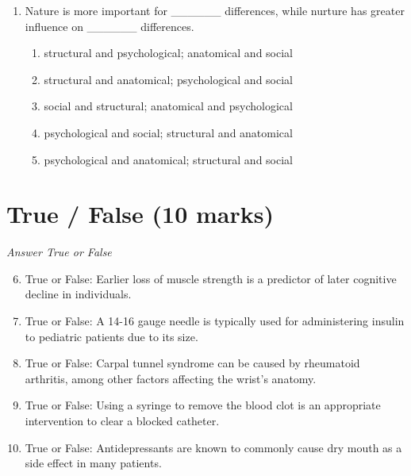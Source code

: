 \documentclass[12pt]{article}
\begin{document}
\begin{enumerate}[label=\arabic*.]
\begin{enumerate}[label=(\alph*)]
    \item If the incidence rate of the disease falls.
    \item If effective treatment for the disease becomes widely available.
    \item If vaccination against the disease becomes more common.
    \item If the disease mutates to a less harmful form.
    \item If the population's overall health improves.
\end{enumerate}
\item Nature is more important for \_\_\_\_\_\_ differences, while nurture has greater influence on \_\_\_\_\_\_ differences.
\begin{enumerate}[label=(\alph*)]
    \item structural and psychological; anatomical and social
    \item structural and anatomical; psychological and social
    \item social and structural; anatomical and psychological
    \item psychological and social; structural and anatomical
    \item psychological and anatomical; structural and social
\end{enumerate}
\end{enumerate}

\section*{True / False (10 marks)}
\textit{Answer True or False}
\begin{enumerate}[label=\arabic*.]
\setcounter{enumi}{5}
\item True or False: Earlier loss of muscle strength is a predictor of later cognitive decline in individuals.
\item True or False: A 14-16 gauge needle is typically used for administering insulin to pediatric patients due to its size.
\item True or False: Carpal tunnel syndrome can be caused by rheumatoid arthritis, among other factors affecting the wrist's anatomy.
\item True or False: Using a syringe to remove the blood clot is an appropriate intervention to clear a blocked catheter.
\item True or False: Antidepressants are known to commonly cause dry mouth as a side effect in many patients.
\end{enumerate}
\end{document}
